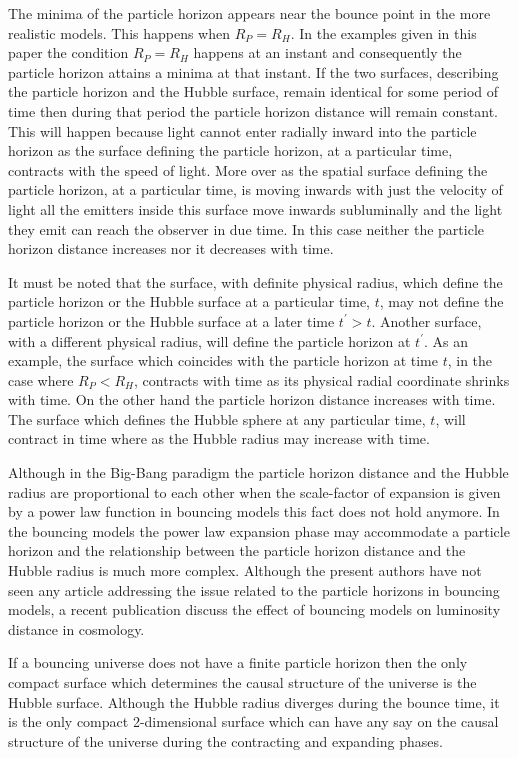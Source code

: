 \documentclass[24pt]{article}
\begin{document}
The minima of the particle horizon appears near the bounce point in
the more realistic models. This happens when $R_P=R_H$. In the
examples given in this paper the condition $R_P=R_H$ happens at an
instant and consequently the particle horizon attains a minima at that
instant. If the two surfaces, describing the particle horizon and the
Hubble surface, remain identical for some period of time then during
that period the particle horizon distance will remain constant. This
will happen because light cannot enter radially inward into the
particle horizon as the surface defining the particle horizon, at a
particular time, contracts with the speed of light. More over as the
spatial surface defining the particle horizon, at a particular time,
is moving inwards with just the velocity of light all the emitters
inside this surface move inwards subluminally and the light they emit
can reach the observer in due time. In this case neither the particle
horizon distance increases nor it decreases with time.

It must be noted that the surface, with definite physical radius,
which define the particle horizon or the Hubble surface at a
particular time, $t$, may not define the particle horizon or the
Hubble surface at a later time $t^\prime>t$. Another surface, with a
different physical radius, will define the particle horizon at
$t^\prime$.  As an example, the surface which coincides with the
particle horizon at time $t$, in the case where $R_P < R_H$, contracts
with time as its physical radial coordinate shrinks with time.  On the
other hand the particle horizon distance increases with time. The
surface which defines the Hubble sphere at any particular time, $t$,
will contract in time where as the Hubble radius may increase with
time.

Although in the Big-Bang paradigm the particle horizon distance and
the Hubble radius are proportional to each other when the scale-factor
of expansion is given by a power law function in bouncing models this
fact does not hold anymore. In the bouncing models the power law
expansion phase may accommodate a particle horizon and the
relationship between the particle horizon distance and the Hubble
radius is much more complex.  Although the present authors have not
seen any article addressing the issue related to the particle horizons
in bouncing models, a recent publication \cite{Barrau:2017ukm} discuss
the effect of bouncing models on luminosity distance in cosmology.

If a bouncing universe does not have a finite particle horizon then
the only compact surface which determines the causal structure of the
universe is the Hubble surface. Although the Hubble radius diverges
during the bounce time, it is the only compact 2-dimensional surface
which can have any say on the causal structure of the universe during
the contracting and expanding phases.
\end{document}
